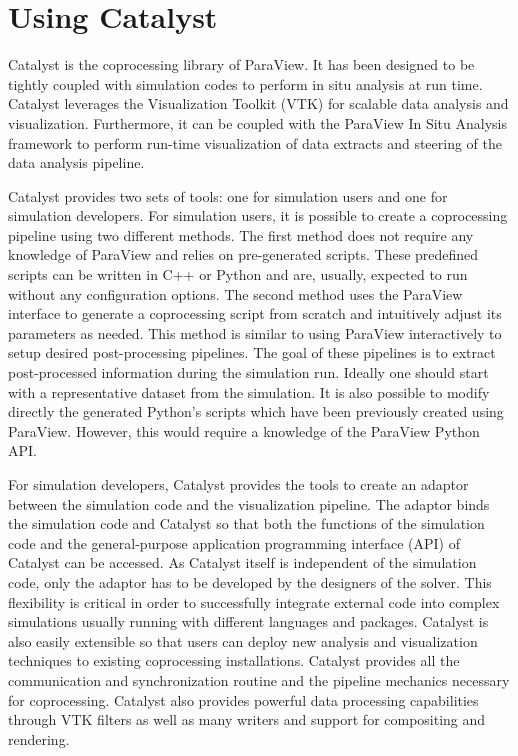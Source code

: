 \section{Using Catalyst}
\label{sec:catalyst}

Catalyst is the coprocessing library of ParaView. 
It has been designed to be tightly coupled with simulation codes to perform in situ analysis at run time. 
Catalyst leverages the Visualization Toolkit (VTK) for scalable data analysis and visualization. Furthermore, it can be coupled with the ParaView In Situ Analysis framework to perform run-time visualization of data extracts and steering of the data analysis pipeline.

Catalyst provides two sets of tools: one for simulation users and one for simulation developers.
For simulation users, it is possible to create a coprocessing pipeline using two different methods. 
The first method does not require any knowledge of ParaView and relies on pre-generated scripts. These predefined scripts can be written in C++ or Python and are, usually, expected to run without any configuration options. 
The second method uses the ParaView interface to generate a coprocessing script from scratch and intuitively adjust its parameters as needed. This method is similar to using ParaView interactively to setup desired post-processing pipelines. The goal of these pipelines is to extract post-processed information during the simulation run. Ideally one should start with a representative dataset from the simulation. It is also possible to modify directly the generated Python's scripts which have been previously created using ParaView. However, this would require a knowledge of the ParaView Python API.

For simulation developers, Catalyst provides the tools to create an adaptor between the simulation code and the visualization pipeline.
The adaptor binds the simulation code and Catalyst so that both the functions of the simulation code and the general-purpose application programming interface (API) of Catalyst can be accessed. As Catalyst itself is independent of the simulation code, only the adaptor has to be developed by the designers of the solver. This flexibility is critical in order to successfully integrate external code into complex simulations usually running with different languages and packages. Catalyst is also easily extensible so that users can deploy new analysis and visualization techniques to existing coprocessing installations. Catalyst provides all the communication and synchronization routine and the pipeline mechanics necessary for coprocessing. Catalyst also provides powerful data processing capabilities through VTK filters as well as many writers and support for compositing and rendering.

